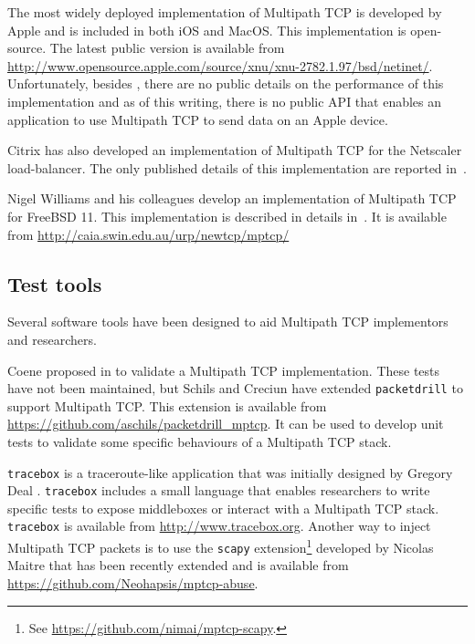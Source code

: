 The most widely deployed implementation of Multipath TCP is developed by Apple and is included in both iOS and MacOS. This implementation is open-source. The latest public version is available from \url{http://www.opensource.apple.com/source/xnu/xnu-2782.1.97/bsd/netinet/}. Unfortunately, besides \cite{draft-eardley-mptcp-implementations-survey}, there are no public details on the performance of this implementation and as of this writing, there is no public API that enables an application to use Multipath TCP to send data on an Apple device.

Citrix has also developed an implementation of Multipath TCP for the Netscaler load-balancer. The only published details of this implementation are reported in~\cite{draft-eardley-mptcp-implementations-survey}.

Nigel Williams and his colleagues develop an implementation of Multipath TCP for FreeBSD 11. This implementation is described in details in~\cite{Williams_Design:2014}. It is available from \url{http://caia.swin.edu.au/urp/newtcp/mptcp/}

\subsection{Test tools}

Several software tools have been designed to aid Multipath TCP implementors and researchers. 

Coene proposed in \cite{draft-coene-mptcp-conformance} to validate a Multipath TCP implementation. These tests have not been maintained, but Schils and Creciun have extended \texttt{packetdrill} \cite{Cardwell_packetdrill:2013} to support Multipath TCP. This extension is available from \url{https://github.com/aschils/packetdrill_mptcp}. It can be used to develop unit tests to validate some specific behaviours of a Multipath TCP stack.

\texttt{tracebox} is a traceroute-like application that was initially designed by Gregory Deal \cite{Detal_tracebox:2013}. \texttt{tracebox} includes a small language that enables researchers to write specific tests to expose middleboxes or interact with a Multipath TCP stack. \texttt{tracebox} is available from \url{http://www.tracebox.org}. Another way to inject Multipath TCP packets is to use the \texttt{scapy} extension\footnote{See \url{https://github.com/nimai/mptcp-scapy}.} developed by Nicolas Maitre that has been recently extended and is available from \url{https://github.com/Neohapsis/mptcp-abuse}.



